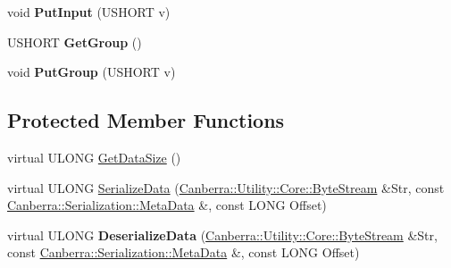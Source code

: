 \begin{DoxyCompactItemize}
void {\bfseries Put\+Input} (U\+S\+H\+O\+RT v)
\item 
\mbox{\label{class_canberra_1_1_data_types_1_1_spectroscopy_1_1_spectral_data_a9378d797c140f36e9640c790cc0a0674}} 
U\+S\+H\+O\+RT {\bfseries Get\+Group} ()
\item 
\mbox{\label{class_canberra_1_1_data_types_1_1_spectroscopy_1_1_spectral_data_afb8abe2a31d4a58586dbfa87c970f686}} 
void {\bfseries Put\+Group} (U\+S\+H\+O\+RT v)
\end{DoxyCompactItemize}
\subsection*{Protected Member Functions}
\begin{DoxyCompactItemize}
\item 
virtual U\+L\+O\+NG \hyperlink{class_canberra_1_1_data_types_1_1_spectroscopy_1_1_spectral_data_ac95bb6b9dd1b89c6c85b9a8afccd5d20_ac95bb6b9dd1b89c6c85b9a8afccd5d20}{Get\+Data\+Size} ()
\item 
virtual U\+L\+O\+NG \hyperlink{class_canberra_1_1_data_types_1_1_spectroscopy_1_1_spectral_data_ab52ed322617b69a8777302d6b7ccbe8a_ab52ed322617b69a8777302d6b7ccbe8a}{Serialize\+Data} (\hyperlink{class_canberra_1_1_utility_1_1_core_1_1_byte_stream}{Canberra\+::\+Utility\+::\+Core\+::\+Byte\+Stream} \&Str, const \hyperlink{class_canberra_1_1_serialization_1_1_meta_data}{Canberra\+::\+Serialization\+::\+Meta\+Data} \&, const L\+O\+NG Offset)
\item 
\mbox{\label{class_canberra_1_1_data_types_1_1_spectroscopy_1_1_spectral_data_a02bfa706b95c7d83a9de5ddd9093a059}} 
virtual U\+L\+O\+NG {\bfseries Deserialize\+Data} (\hyperlink{class_canberra_1_1_utility_1_1_core_1_1_byte_stream}{Canberra\+::\+Utility\+::\+Core\+::\+Byte\+Stream} \&Str, const \hyperlink{class_canberra_1_1_serialization_1_1_meta_data}{Canberra\+::\+Serialization\+::\+Meta\+Data} \&, const L\+O\+NG Offset)
\end{DoxyCompactItemize}
